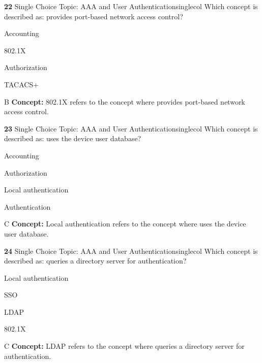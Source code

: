 \documentclass[10pt,a4paper]{article}
\begin{document}
\begin{qcard}{\color{white}\textbf{22} \hfill \small Single Choice \textbar{} Topic: AAA and User Authentication}{singlecol}
Which concept is described as: provides port-based network access control?

\begin{qoptions}
\item Accounting
\item 802.1X
\item Authorization
\item TACACS+
\end{qoptions}
\begin{explainbox}{B}
\textbf{Concept:} 802.1X refers to the concept where provides port-based network access control.
\end{explainbox}
\end{qcard}

\begin{qcard}{\color{white}\textbf{23} \hfill \small Single Choice \textbar{} Topic: AAA and User Authentication}{singlecol}
Which concept is described as: uses the device user database?

\begin{qoptions}
\item Accounting
\item Authorization
\item Local authentication
\item Authentication
\end{qoptions}
\begin{explainbox}{C}
\textbf{Concept:} Local authentication refers to the concept where uses the device user database.
\end{explainbox}
\end{qcard}

\begin{qcard}{\color{white}\textbf{24} \hfill \small Single Choice \textbar{} Topic: AAA and User Authentication}{singlecol}
Which concept is described as: queries a directory server for authentication?

\begin{qoptions}
\item Local authentication
\item SSO
\item LDAP
\item 802.1X
\end{qoptions}
\begin{explainbox}{C}
\textbf{Concept:} LDAP refers to the concept where queries a directory server for authentication.
\end{explainbox}
\end{qcard}
\end{document}

